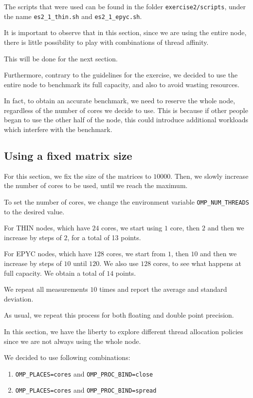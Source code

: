 \documentclass{report}
\begin{document}
The scripts that were used can be found in the folder \texttt{exercise2/scripts}, 
under the name \texttt{es2\_1\_thin.sh} and \texttt{es2\_1\_epyc.sh}.

It is important to observe that in this section, since we are using the entire 
node, there is little possibility to play with combinations of thread affinity.

This will be done for the next section.

Furthermore, contrary to the guidelines for the exercise, we decided to use the 
entire node to benchmark its full capacity, and also to avoid wasting 
resources. 

In fact, to obtain an accurate benchmark, we need to reserve the whole node, 
regardless of the number of cores we decide to use. This is because if other 
people began to use the other half of the node, this could introduce additional 
workloads which interfere with the benchmark. 

\subsection{Using a fixed matrix size}

For this section, we fix the size of the matrices to $10000$. Then, we slowly 
increase the number of cores to be used, until we reach the maximum. 

To set the number of cores, we change the environment variable 
\texttt{OMP\_NUM\_THREADS} to the desired value.

For THIN nodes, which have $24$ cores, we start using $1$ core, then $2$ and 
then we increase by steps of $2$, for a total of 13 points.

For EPYC nodes, which have $128$ cores, we start from $1$, then $10$ and then 
we increase by steps of $10$ until $120$. We also use $128$ cores, to see what 
happens at full capacity. We obtain a total of $14$ points.

We repeat all measurements $10$ times and report the average and standard 
deviation.

As usual, we repeat this process for both floating and double point precision.

In this section, we have the liberty to explore different thread allocation 
policies since we are not always using the whole node. 

We decided to use following combinations:
\begin{enumerate}
    \item \texttt{OMP\_PLACES=cores} and \texttt{OMP\_PROC\_BIND=close} 
    \item \texttt{OMP\_PLACES=cores} and \texttt{OMP\_PROC\_BIND=spread} 
\end{enumerate}
\end{document}
